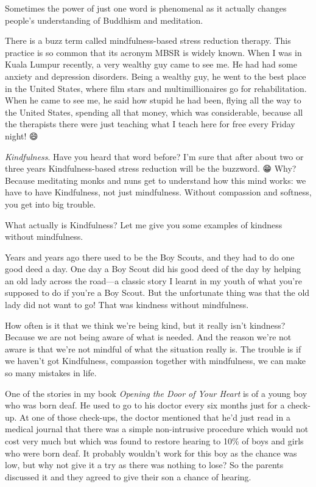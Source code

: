\documentclass[12pt, openany]{book}
\begin{document}
Sometimes the power of just one word is phenomenal as it actually changes people’s understanding of Buddhism and meditation. 

There is a buzz term called mindfulness-based stress reduction therapy. This practice is so common that its acronym MBSR is widely known. When I was in Kuala Lumpur recently, a very wealthy guy came to see me. He had had some anxiety and depression disorders. Being a wealthy guy, he went to the best place in the United States, where film stars and multimillionaires go for rehabilitation. When he came to see me, he said how stupid he had been, flying all the way to the United States, spending all that money, which was considerable, because all the therapists there were just teaching what I teach here for free every Friday night! 😄

\emph{Kindfulness}. Have you heard that word before? I’m sure that after about two or three years Kindfulness-based stress reduction will be the buzzword. 😁 Why? Because meditating monks and nuns get to understand how this mind works: we have to have Kindfulness, not just mindfulness. Without compassion and softness, you get into big trouble. 

What actually is Kindfulness? Let me give you some examples of kindness without mindfulness. 

Years and years ago there used to be the Boy Scouts, and they had to do one good deed a day. One day a Boy Scout did his good deed of the day by helping an old lady across the road—a classic story I learnt in my youth of what you’re supposed to do if you’re a Boy Scout. But the unfortunate thing was that the old lady did not want to go! That was kindness without mindfulness. 

How often is it that we think we’re being kind, but it really isn’t kindness? Because we are not being aware of what is needed. And the reason we’re not aware is that we’re not mindful of what the situation really is. The trouble is if we haven’t got Kindfulness, compassion together with mindfulness, we can make so many mistakes in life. 

One of the stories in my book \emph{Opening the Door of Your Heart} is of a young boy who was born deaf. He used to go to his doctor every six months just for a check-up. At one of those check-ups, the doctor mentioned that he’d just read in a medical journal that there was a simple non-intrusive procedure which would not cost very much but which was found to restore hearing to 10\% of boys and girls who were born deaf. It probably wouldn’t work for this boy as the chance was low, but why not give it a try as there was nothing to lose? So the parents discussed it and they agreed to give their son a chance of hearing. 
\end{document}
